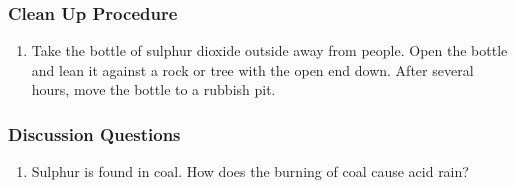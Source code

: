 \subsubsection*{Clean Up Procedure}
\begin{enumerate}
\item{Take the bottle of sulphur dioxide outside away from people. Open the bottle and lean it against a rock or tree with the open end down. After several hours, move the bottle to a rubbish pit.}
\end{enumerate}

\subsubsection*{Discussion Questions}
\begin{enumerate}
\item{Sulphur is found in coal. How does the burning of coal cause acid rain?}
\end{enumerate}
